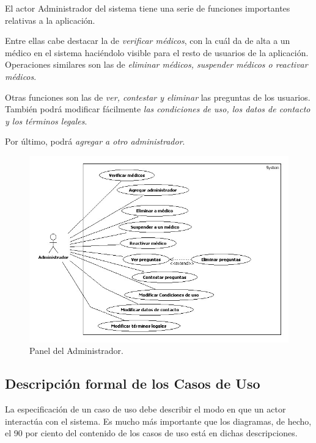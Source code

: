 			El actor Administrador del sistema tiene una serie de funciones importantes relativas a la aplicación. 
			
			Entre ellas cabe destacar la de \textit{verificar médicos}, con la cuál da de alta a un médico en el sistema haciéndolo visible para el resto de usuarios de la aplicación. Operaciones similares son las de \textit{eliminar médicos, suspender médicos o reactivar médicos}. 
			
			Otras funciones son las de \textit{ver, contestar y eliminar} las preguntas de los usuarios. También podrá modificar fácilmente \textit{las condiciones de uso, los datos de contacto y los términos legales}. 
			
			Por último, podrá \textit{agregar a otro administrador}.
			
			\begin{figure}[H]
			  \centering
			    \includegraphics[width=15cm]{img/jpg/casos_uso/Panel_de_Administrador.jpg}
			  \caption{Panel del Administrador.}
			  \label{fig:panel_admin}
			\end{figure}
					
	
	\newpage
	\subsection{Descripción formal de los Casos de Uso} %
	\label{sub:descripcion_formal_de_los_casos_de_uso}
		
		La especificación de un caso de uso debe describir el modo en que un actor interactúa con el sistema. Es mucho más importante que los diagramas, de hecho, el 90 por ciento del contenido de los casos de uso está en dichas descripciones.
			
